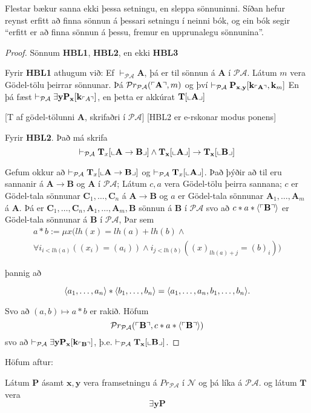 \documentclass[12pt]{book}
\newcommand{\cP}{\mathcal{P}}
\newcommand{\cA}{\mathcal{A}}
\newcommand{\PA}{\mathcal{PA}}
\newcommand{\cN}{\mathcal{N}}
\newcommand{\bA}{\mathbf{A}}
\newcommand{\bB}{\mathbf{B}}
\newcommand{\bC}{\mathbf{C}}
\newcommand{\bT}{\mathbf{T}}
\newcommand{\bP}{\mathbf{P}}
\newcommand{\bx}{\mathbf{x}}
\newcommand{\bk}{\mathbf{k}}
\newcommand{\by}{\mathbf{y}}
\newcommand{\aan}{a_1, \dotsc, a_n}
\newcommand{\vP}{\vdash_{\PA}}
\DeclarePairedDelimiter{\god}{\ulcorner}{\urcorner}
\DeclarePairedDelimiter{\pg}{\llcorner}{\lrcorner}
\begin{document}
\begin{ath}
  Flestar bækur sanna ekki þessa setningu, en sleppa sönnuninni. Síðan hefur
  reynst erfitt að finna sönnun á þessari setningu í neinni bók, og ein bók
 segir ``erfitt er að finna sönnun á þessu, fremur en upprunalegu sönnunina''.
\end{ath}

\begin{proof}
  Sönnum \textbf{HBL1}, \textbf{HBL2}, en ekki \textbf{HBL3}

  Fyrir \textbf{HBL1} athugum við:  Ef $\vP \bA$, þá er
  til sönnun á $\bA$ í $\PA$. Látum $m$ vera Gödel-tölu
  þeirrar sönnunar. Þá $\cP r_{\PA}(\god{\bA},m)$ og því
  $\vP \bP_{\bx,\by} [\bk_{\god{\bA}},\bk_m]$
  En þá fæst $\vP \exists \by \bP_{\bx}[\bk_{\god{A}}]$, en þetta er akkúrat
  $\bT[\pg{\bA}]$

 [T af gödel-tölunni $\bA$, skrifaðri í $\PA$]
 [HBL2 er e-rskonar modus ponens]

 Fyrir \textbf{HBL2}. Það má skrifa
 \[\vP \bT_x[\pg{\bA \to \bB}] \wedge \bT_{\bx}[\pg{\bA}] \to \bT_{\bx}[\pg{\bB}]\]


 Gefum okkur að $\vP \bT_x[\pg{\bA \to \bB}]$ og
 $\vP \bT_x[\pg{\bA}]$. Það þýðir að til eru sannanir á 
 $\bA \to \bB$ og $\bA$ í $\PA$;
 Látum $c,a$ vera Gödel-tölu þeirra sannana;
 $c$ er Gödel-tala sönnunar $\bC_1, \dotsc, \bC_n$ á
 $\bA \to \bB$ og $a$ er Gödel-tala sönnunar
 $\bA_1, \dotsc, \bA_m$ á $\bA$. Þá er
 $\bC_1, \dotsc, \bC_n,\bA_1, \dotsc, \bA_m, \bB$ sönnun á $\bB$ í $\PA$
 svo að $c * a * \braket{\god{\bB}}$ er Gödel-tala sönnunar á $\bB$ í $\PA$,
 Þar sem 
 \begin{gather*}
   a*b := \mu x (lh(x) = lh(a) + lh(b) \wedge\\
   \forall i_{i < lh(a)} ((x_i) = (a_i)) \wedge i_{j< lh(b)} ((x)_{lh(a)+j} = (b)_i))
 \end{gather*}

þannig að 

\[\braket{\aan} *  \braket{b_1, \dotsc, b_n} = \braket{\aan, b_1, \dotsc,b_n}.\]

Svo að $(a,b) \mapsto a*b$ er rakið. Höfum
\[ \cP r_{\PA} (\god{\bB}, c * a * \braket{\god{\bB}})\]
svo að $\vP \exists \by \bP_{\bx}[\bk_{\god{\bB}}]$, þ.e. $\vP \bT_{\bx} [\pg{\bB}]$.
\end{proof}


Höfum aftur:

Látum $\bP$ ásamt $\bx,\by$ vera framsetningu á 
$Pr_{\cP\cA}$ í $\cN$ og þá líka á $\PA$.
 og látum $\bT$ vera
 \[ \exists \by \bP \]
\end{document}
